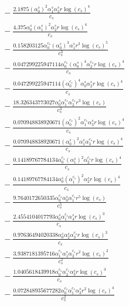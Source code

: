 \documentclass[10pt]{article}
\begin{document}
\begin{align*}
&{}  - \frac{2.1875 \left(\alpha_{0}^s\right)^{2} \alpha_{1}^s \alpha_{3}^s r \log{\left(c_{s} \right)}^{4}}{c_{s}} \\
&{}  - \frac{4.375 \alpha_{0}^s \left(\alpha_{1}^s\right)^{2} \alpha_{2}^s r \log{\left(c_{s} \right)}^{4}}{c_{s}} \\
&{}  - \frac{0.158203125 \alpha_{0}^{c_s} \left(\alpha_{0}^s\right)^{3} \alpha_{1}^s r^{3} \log{\left(c_{s} \right)}^{5}}{c_{s}^{3}} \\
&{}  - \frac{0.047299225947114 \alpha_{0}^{c_s} \left(\alpha_{0}^s\right)^{4} \alpha_{2}^{c_s} r \log{\left(c_{s} \right)}^{4}}{c_{s}} \\
&{}  - \frac{0.047299225947114 \left(\alpha_{0}^{c_s}\right)^{4} \alpha_{0}^s \alpha_{2}^s r \log{\left(c_{s} \right)}^{4}}{c_{s}} \\
&{}  - \frac{18.326343773027 \alpha_{0}^s \alpha_{1}^{c_s} \alpha_{2}^{c_s} r^{3} \log{\left(c_{s} \right)}}{c_{s}^{3}} \\
&{}  - \frac{0.070948838920671 \left(\alpha_{0}^{c_s}\right)^{2} \alpha_{1}^{c_s} \alpha_{3}^s r \log{\left(c_{s} \right)}^{4}}{c_{s}} \\
&{}  - \frac{0.070948838920671 \left(\alpha_{0}^s\right)^{2} \alpha_{1}^s \alpha_{3}^{c_s} r \log{\left(c_{s} \right)}^{4}}{c_{s}} \\
&{}  - \frac{0.14189767784134 \alpha_{0}^{c_s} \left(\alpha_{1}^s\right)^{2} \alpha_{2}^{c_s} r \log{\left(c_{s} \right)}^{4}}{c_{s}} \\
&{}  - \frac{0.14189767784134 \alpha_{0}^s \left(\alpha_{1}^{c_s}\right)^{2} \alpha_{2}^s r \log{\left(c_{s} \right)}^{4}}{c_{s}} \\
&{}  - \frac{9.7640172650335 \alpha_{0}^{c_s} \alpha_{0}^s \alpha_{1}^{c_s} r^{5} \log{\left(c_{s} \right)}}{c_{s}^{5}} \\
&{}  - \frac{2.4554104017793 \alpha_{0}^s \alpha_{1}^{c_s} \alpha_{4}^s r \log{\left(c_{s} \right)}^{3}}{c_{s}} \\
&{}  - \frac{0.97636494020338 \alpha_{0}^s \alpha_{2}^s \alpha_{3}^{c_s} r \log{\left(c_{s} \right)}^{3}}{c_{s}} \\
&{}  - \frac{3.9387181395716 \alpha_{1}^{c_s} \alpha_{1}^s \alpha_{2}^{c_s} r^{2} \log{\left(c_{s} \right)}^{2}}{c_{s}^{2}} \\
&{}  - \frac{1.0405618439918 \alpha_{0}^{c_s} \alpha_{2}^{c_s} \alpha_{3}^s r \log{\left(c_{s} \right)}^{3}}{c_{s}} \\
&{}  - \frac{0.072848935677282 \alpha_{0}^{c_s} \alpha_{1}^{c_s} \alpha_{3}^s r^{2} \log{\left(c_{s} \right)}^{4}}{c_{s}^{2}} \\

\end{align*}
\end{document}
